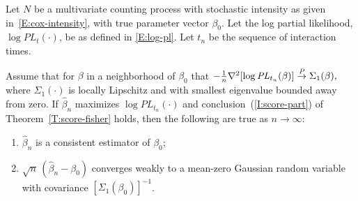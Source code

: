 \documentclass[final]{statsoc}
\begin{document}
\begin{theorem}\label{T:consistency}
    Let $N$ be a multivariate counting process with stochastic
    intensity as given in~\eqref{E:cox-intensity}, with true parameter
    vector $\beta_0$.  Let the log partial likelihood,
    $\log \mathit{PL}_t(\cdot)$, be as defined in \eqref{E:log-pl}.
    Let $t_n$ be the sequence of interaction times.

    Assume that for $\beta$ in a
    neighborhood of $\beta_0$ that
    \(
        -\tfrac{1}{n} \nabla^2 [ \log \mathit{PL}_{t_n}(\beta)]
            \overset{\mathit{P}}{\to} \Sigma_1(\beta),
    \)
    where $\Sigma_1(\cdot)$ is locally Lipschitz and with smallest
    eigenvalue bounded away from zero.
    If $\hat \beta_n$ maximizes $\log \mathit{PL}_{t_n}(\cdot)$ and
    conclusion~(\ref{I:score-part}) of Theorem~\ref{T:score-fisher} holds,
    then the following are true as $n\to\infty$:
    \begin{enumerate}
        \item $\hat \beta_n$ is a consistent estimator of $\beta_0$;
        \item $\sqrt{n} \, (\hat \beta_n - \beta_0)$ converges weakly
            to a mean-zero Gaussian random variable with covariance
            $[\Sigma_1(\beta_0)]^{-1}$.
    \end{enumerate}
\end{theorem}
\end{document}

